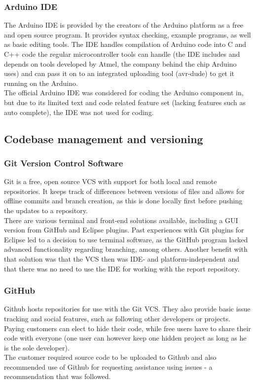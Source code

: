 \subsubsection{Arduino IDE}
The Arduino IDE is provided by the creators of the Arduino platform as a free and open source program. It provides syntax checking, example programs, as well as basic editing tools. The IDE handles compilation of Arduino code into C and C++ code the regular microcontroller tools can handle (the IDE includes and depends on tools developed by Atmel, the company behind the chip Arduino uses) and can pass it on to an integrated uploading tool (avr-dude) to get it running on the Arduino.\\
The official Arduino IDE was considered for coding the Arduino component in, but due to its limited text and code related feature set (lacking features such as auto complete), the IDE was not used for coding.

\subsection{Codebase management and versioning}
\subsubsection{Git Version Control Software}
Git is a free, open source VCS with support for both local and remote repositories. It keeps track of differences between versions of files and allows for offline commits and branch creation, as this is done locally first before pushing the updates to a repository.\\
There are various terminal and front-end solutions available, including a GUI version from GitHub and Eclipse plugins. Past experiences with Git plugins for Eclipse led to a decision to use terminal software, as the GitHub program lacked advanced functionality regarding branching, among others. Another benefit with that solution was that the VCS then was IDE- and platform-independent and that there was no need to use the IDE for working with the report repository.
\subsubsection{GitHub}
Github hosts repositories for use with the Git VCS. They also provide basic issue tracking and social features, such as following other developers or projects. Paying customers can elect to hide their code, while free users have to share their code with everyone (one user can however keep one hidden project as long as he is the sole developer).\\
The customer required source code to be uploaded to Github and also recommended use of Github for requesting assistance using issues - a recommendation that was followed.\\

